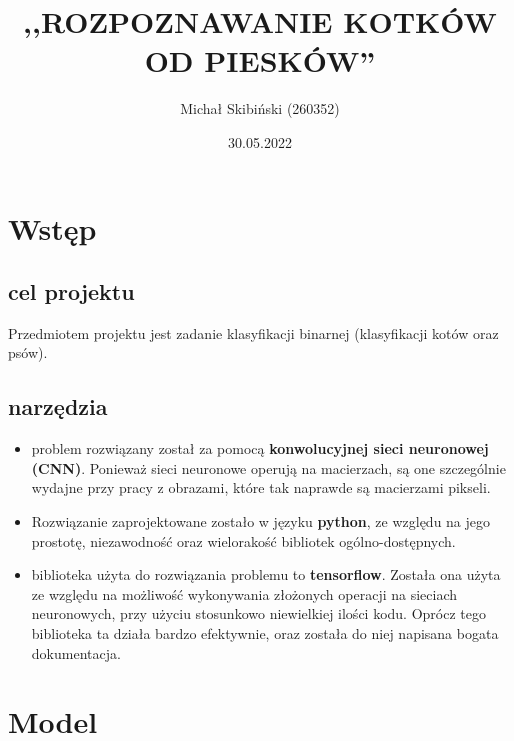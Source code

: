 \documentclass[a4paper,12pt]{scrartcl}
\title{,,ROZPOZNAWANIE KOTKÓW OD PIESKÓW''}
\author{Michał Skibiński (260352)}
\date{30.05.2022}
\begin{document}
\maketitle

\renewcommand*\contentsname{spis treści}
\tableofcontents
\newpage{}

\section{Wstęp}
\subsection{cel projektu}
Przedmiotem projektu jest zadanie klasyfikacji binarnej (klasyfikacji kotów oraz psów).
\subsection{narzędzia}
\begin{itemize}
\item problem rozwiązany został za pomocą  \textbf{konwolucyjnej sieci neuronowej (CNN)}.
Ponieważ sieci neuronowe operują na macierzach, są one szczególnie wydajne przy pracy z obrazami, 
które tak naprawde są macierzami pikseli. \\
\item Rozwiązanie zaprojektowane zostało w języku \textbf{python}, ze względu na jego prostotę, 
niezawodność oraz wielorakość bibliotek ogólno-dostępnych. \\
\item biblioteka użyta do rozwiązania problemu to \textbf{tensorflow}. Została ona użyta ze względu na możliwość 
wykonywania złożonych operacji na sieciach neuronowych, przy użyciu stosunkowo
niewielkiej ilości kodu. Oprócz tego biblioteka ta działa bardzo efektywnie,
 oraz została do niej napisana bogata dokumentacja.\\
\end{itemize}
\newpage{}
\section{Model}
\end{document}
